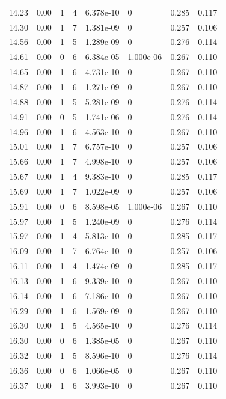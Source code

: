 \documentclass[preview]{standalone}
\begin{document}
{{{\begin{tabular}{L{1.2cm}C{1.2cm} C{0.3cm}C{0.5cm} C{1.4cm}C{1.4cm} C{1.4cm}C{1.4cm}}
  14.23  &  0.00  & 1     &  4 &  6.378e-10  & 0  & 0.285 &  0.117   \\ 
  14.30  &  0.00  & 1     &  7 &  1.381e-09  & 0  & 0.257 &  0.106   \\ 
  14.56  &  0.00  & 1     &  5 &  1.289e-09  & 0  & 0.276 &  0.114   \\ 
  14.61  &  0.00  & 0     &  6 &  6.384e-05  & 1.000e-06  & 0.267 &  0.110   \\ 
  14.65  &  0.00  & 1     &  6 &  4.731e-10  & 0  & 0.267 &  0.110   \\ 
  14.87  &  0.00  & 1     &  6 &  1.271e-09  & 0  & 0.267 &  0.110   \\ 
  14.88  &  0.00  & 1     &  5 &  5.281e-09  & 0  & 0.276 &  0.114   \\ 
  14.91  &  0.00  & 0     &  5 &  1.741e-06  & 0  & 0.276 &  0.114   \\ 
  14.96  &  0.00  & 1     &  6 &  4.563e-10  & 0  & 0.267 &  0.110   \\ 
  15.01  &  0.00  & 1     &  7 &  6.757e-10  & 0  & 0.257 &  0.106   \\ 
  15.66  &  0.00  & 1     &  7 &  4.998e-10  & 0  & 0.257 &  0.106   \\ 
  15.67  &  0.00  & 1     &  4 &  9.383e-10  & 0  & 0.285 &  0.117   \\ 
  15.69  &  0.00  & 1     &  7 &  1.022e-09  & 0  & 0.257 &  0.106   \\ 
  15.91  &  0.00  & 0     &  6 &  8.598e-05  & 1.000e-06  & 0.267 &  0.110   \\ 
  15.97  &  0.00  & 1     &  5 &  1.240e-09  & 0  & 0.276 &  0.114   \\ 
  15.97  &  0.00  & 1     &  4 &  5.813e-10  & 0  & 0.285 &  0.117   \\ 
  16.09  &  0.00  & 1     &  7 &  6.764e-10  & 0  & 0.257 &  0.106   \\ 
  16.11  &  0.00  & 1     &  4 &  1.474e-09  & 0  & 0.285 &  0.117   \\ 
  16.13  &  0.00  & 1     &  6 &  9.339e-10  & 0  & 0.267 &  0.110   \\ 
  16.14  &  0.00  & 1     &  6 &  7.186e-10  & 0  & 0.267 &  0.110   \\ 
  16.29  &  0.00  & 1     &  6 &  1.569e-09  & 0  & 0.267 &  0.110   \\ 
  16.30  &  0.00  & 1     &  5 &  4.565e-10  & 0  & 0.276 &  0.114   \\ 
  16.30  &  0.00  & 0     &  6 &  1.385e-05  & 0  & 0.267 &  0.110   \\ 
  16.32  &  0.00  & 1     &  5 &  8.596e-10  & 0  & 0.276 &  0.114   \\ 
  16.36  &  0.00  & 0     &  6 &  1.066e-05  & 0  & 0.267 &  0.110   \\ 
  16.37  &  0.00  & 1     &  6 &  3.993e-10  & 0  & 0.267 &  0.110   \\ 
\hline 
\end{tabular} 

}}}
\end{document}
